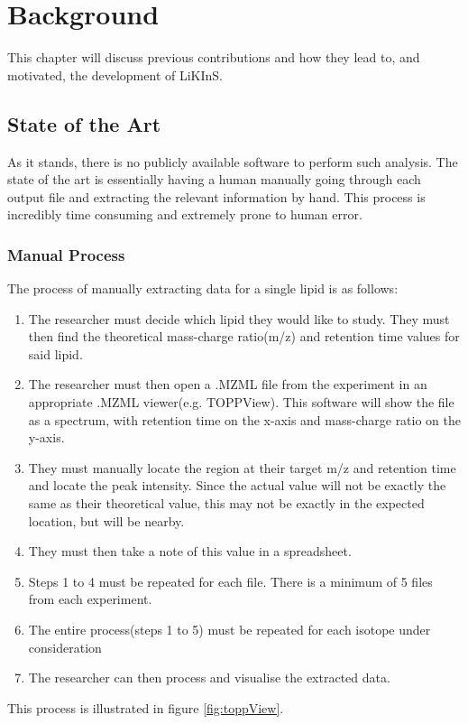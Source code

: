 \documentclass{l4proj}
\begin{document}
\chapter{Background}
This chapter will discuss previous contributions and how they lead to, and motivated, the development of LiKInS.

\section{State of the Art} \label{state-of-the-art}

As it stands, there is no publicly available software to perform such analysis. The state of the art is essentially having a human manually going through each output file and extracting the relevant information by hand. This process is incredibly time consuming and extremely prone to human error.
\subsection{Manual Process}\label{manual-process}
The process of manually extracting data for a single lipid is as follows:
\begin{enumerate}
    \item The researcher must decide which lipid they would like to study. They must then find the theoretical mass-charge ratio(m/z) and retention time values for said lipid.  
    \item The researcher must then open a .MZML file from the experiment in an appropriate .MZML viewer(e.g. TOPPView). This software will show the file as a spectrum, with retention time on the x-axis and mass-charge ratio on the y-axis.
    \item They must manually locate the region at their target m/z and retention time and locate the peak intensity. Since the actual value will not be exactly the same as their theoretical value, this may not be exactly in the expected location, but will be nearby. 
    \item They must then take a note of this value in a spreadsheet.
    \item Steps 1 to 4 must be repeated for each file. There is a minimum of 5 files from each experiment.
    \item The entire process(steps 1 to 5) must be repeated for each isotope under consideration
    \item The researcher can then process and visualise the extracted data.
\end{enumerate}
This process is illustrated in figure \ref{fig:toppView}.
\end{document}
